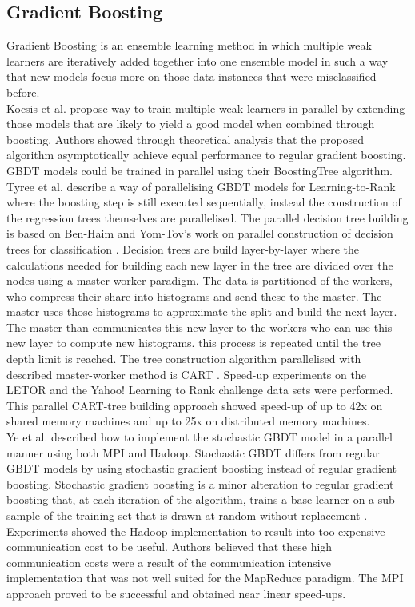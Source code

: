 \subsection{Gradient Boosting}
Gradient Boosting \cite{Friedman2001} is an ensemble learning method in which multiple weak learners are iteratively added together into one ensemble model in such a way that new models focus more on those data instances that were misclassified before.\\

Kocsis et al. \cite{Kocsis2013} propose way to train multiple weak learners in parallel by extending those models that are likely to yield a good model when combined through boosting. Authors showed through theoretical analysis that the proposed algorithm asymptotically achieve equal performance to regular gradient boosting. \ac{GBDT} models could be trained in parallel using their BoostingTree algorithm.\\

Tyree et al. \cite{Tyree2011} describe a way of parallelising \ac{GBDT} models for Learning-to-Rank where the boosting step is still executed sequentially, instead the construction of the regression trees themselves are parallelised. The parallel decision tree building is based on Ben-Haim and Yom-Tov's work on parallel construction of decision trees for classification \cite{Ben-Haim2010}. Decision trees are build layer-by-layer where the calculations needed for building each new layer in the tree are divided over the nodes using a master-worker paradigm. The data is partitioned of the workers, who compress their share into histograms and send these to the master. The master uses those histograms to approximate the split and build the next layer. The master than communicates this new layer to the workers who can use this new layer to compute new histograms. this process is repeated until the tree depth limit is reached. The tree construction algorithm parallelised with described master-worker method is \ac{CART} \cite{Breiman1984}. Speed-up experiments on the LETOR and the Yahoo! Learning to Rank challenge data sets were performed. This parallel \ac{CART}-tree building approach showed speed-up of up to 42x on shared memory machines and up to 25x on distributed memory machines.\\

Ye et al. \cite{Ye2009} described how to implement the stochastic \ac{GBDT} model in a parallel manner using both MPI and Hadoop. Stochastic \ac{GBDT} differs from regular \ac{GBDT} models by using stochastic gradient boosting instead of regular gradient boosting. Stochastic gradient boosting is a minor alteration to regular gradient boosting that, at each iteration of the algorithm, trains a base learner on a sub-sample of the training set that is drawn at random without replacement \cite{Friedman2002}. Experiments showed the Hadoop implementation to result into too expensive communication cost to be useful. Authors believed that these high communication costs were a result of the communication intensive implementation that was not well suited for the MapReduce paradigm. The MPI approach proved to be successful and obtained near linear speed-ups.\\


